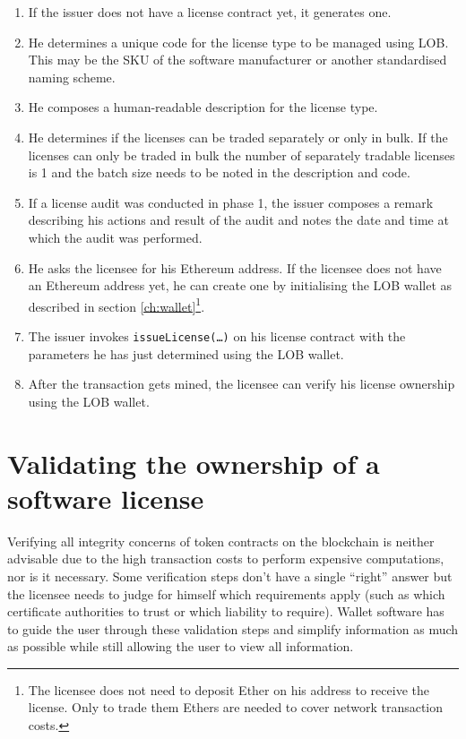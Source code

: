 \documentclass[a4paper]{article}
\begin{document}
\begin{enumerate}
  \item If the issuer does not have a license contract yet, it generates one.
  \item He determines a unique code for the license type to be managed using LOB. This may be the SKU of the software manufacturer or another standardised naming scheme.
  \item He composes a human-readable description for the license type.
  \item He determines if the licenses can be traded separately or only in bulk. If the licenses can only be traded in bulk the number of separately tradable licenses is 1 and the batch size needs to be noted in the description and code.
  \item If a license audit was conducted in phase 1, the issuer composes a remark describing his actions and result of the audit and notes the date and time at which the audit was performed.
  \item He asks the licensee for his Ethereum address. If the licensee does not have an Ethereum address yet, he can create one by initialising the LOB wallet as described in section \ref{ch:wallet}\footnote{The licensee does not need to deposit Ether on his address to receive the license. Only to trade them Ethers are needed to cover network transaction costs.}.
  \item The issuer invokes \texttt{issueLicense(…)} on his license contract with the parameters he has just determined using the LOB wallet.
  \item After the transaction gets mined, the licensee can verify his license ownership using the LOB wallet.
\end{enumerate}





\section{Validating the ownership of a software license}
\label{ch:validatingOwnership}

Verifying all integrity concerns of token contracts on the blockchain is neither advisable due to the high transaction costs to perform expensive computations, nor is it necessary. Some verification steps don't have a single “right” answer but the licensee needs to judge for himself which requirements apply (such as which certificate authorities to trust or which liability to require). Wallet software has to guide the user through these validation steps and simplify information as much as possible while still allowing the user to view all information.
\end{document}
